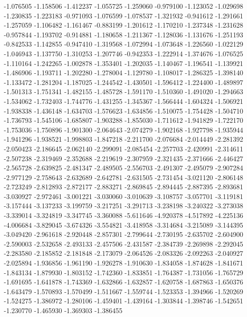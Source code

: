 -1.076505
-1.158506
-1.412237
-1.055725
-1.259060
-0.979100
-1.123052
-1.029698
-1.230835
-1.223183
-0.971093
-1.076599
-1.078537
-1.321932
-0.941612
-1.291661
-1.257059
-1.106482
-1.161467
-0.883199
-1.201612
-1.170210
-1.237348
-1.231628
-0.957844
-1.193702
-0.914881
-1.180658
-1.211367
-1.128036
-1.131676
-1.251193
-0.842533
-1.142855
-0.947410
-1.319568
-1.072994
-1.073648
-1.226560
-1.022129
-1.046943
-1.137750
-1.310253
-1.207746
-0.942353
-1.222914
-1.374676
-1.076525
-1.110164
-1.242265
-1.002878
-1.353401
-1.202035
-1.140467
-1.196541
-1.139921
-1.486906
-1.193711
-1.202280
-1.278004
-1.129780
-1.108017
-1.286325
-1.398140
-1.133472
-1.281204
-1.187025
-1.244542
-1.430501
-1.596412
-1.224400
-1.489897
-1.501313
-1.751341
-1.482155
-1.485728
-1.591170
-1.510360
-1.491020
-1.294663
-1.534062
-1.732403
-1.744776
-1.431255
-1.345367
-1.566444
-1.604324
-1.506921
-1.938338
-1.436148
-1.634703
-1.576623
-1.634856
-1.510075
-1.754428
-1.504710
-1.736793
-1.545106
-1.685807
-1.903288
-1.855030
-1.711612
-1.941829
-1.722170
-1.753036
-1.750896
-1.901300
-2.064643
-2.074279
-1.902168
-1.927798
-1.935944
-1.941296
-1.938521
-1.998803
-1.847218
-2.211700
-2.076684
-2.014449
-2.281392
-2.050423
-2.186645
-2.062140
-2.299091
-2.085454
-2.257703
-2.420991
-2.314611
-2.507238
-2.319469
-2.352688
-2.219619
-2.307959
-2.321435
-2.371666
-2.446427
-2.565728
-2.639825
-2.481347
-2.489505
-2.556703
-2.491307
-2.495079
-2.907284
-2.977129
-2.758643
-2.632689
-2.642781
-2.631505
-2.731454
-3.021120
-2.806148
-2.723249
-2.812893
-2.872177
-2.883271
-2.869845
-2.894445
-2.887395
-2.893681
-3.030927
-2.972461
-3.001221
-3.030060
-3.010639
-3.108757
-3.057701
-3.119181
-3.157444
-3.137233
-3.199759
-3.217251
-3.291713
-3.238198
-3.240322
-3.273038
-3.339014
-3.324819
-3.347745
-3.360088
-5.611646
-4.920378
-4.517892
-4.225136
-4.006684
-3.829045
-3.674326
-3.554821
-3.418958
-3.314684
-3.215089
-3.144395
-3.049420
-2.961618
-2.920448
-2.857301
-2.799644
-2.730195
-2.635702
-2.604900
-2.590003
-2.532658
-2.493133
-2.457506
-2.431587
-2.384739
-2.269898
-2.292045
-2.283580
-2.185852
-2.181848
-2.173079
-2.064526
-2.083326
-2.092263
-2.040927
-2.025894
-1.936856
-1.961190
-1.926278
-1.910630
-1.834058
-1.874628
-1.841671
-1.843134
-1.879930
-1.803152
-1.742360
-1.833851
-1.764387
-1.731056
-1.765729
-1.691695
-1.641878
-1.743369
-1.632866
-1.632857
-1.620758
-1.687863
-1.650376
-1.643479
-1.570893
-1.570499
-1.511667
-1.559744
-1.523353
-1.394966
-1.520269
-1.524275
-1.386972
-1.280106
-1.459401
-1.439164
-1.303844
-1.398746
-1.542651
-1.230770
-1.465930
-1.369303
-1.386455
